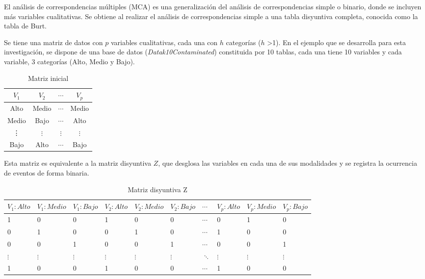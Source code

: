\documentclass[water,article,submit,moreauthors,pdftex]{mdpi}
\begin{document}
El análisis de correspondencias múltiples (MCA) es una generalización
del análisis de correspondencias simple o binario, donde se incluyen más
variables cualitativas. Se obtiene al realizar el análisis de
correspondencias simple a una tabla disyuntiva completa, conocida como
la tabla de Burt.

Se tiene una matriz de datos con \(p\) variables cualitativas, cada una
con \(h\) categorías (\(h\) \textgreater1). En el ejemplo que se
desarrolla para esta investigación, se dispone de una base de datos
(\emph{Datak10Contaminated}) constituida por 10 tablas, cada una tiene
10 variables y cada variable, 3 categorías (Alto, Medio y Bajo).

\begin{table}[!ht]
\begin{center}
 \begin{tabular}{||c c c c||} 
 \hline
 $V_{1}$ & $V_{2}$ & $\cdots$ & $V_{p}$ \\ [0.5ex] 
 \hline\hline
 Alto & Medio & $\cdots$ & Medio\\
 \hline
Medio & Bajo & $\cdots$ & Alto\\
\hline
\vdots & $\vdots$ & $\vdots$ & $\vdots$\\
\hline
Bajo & Alto & $\cdots$ & Bajo \\ [1ex] 
 \hline
\end{tabular}\caption{Matriz inicial}
\label{tab:inicial}
\end{center}
\end{table}

Esta matriz es equivalente a la matriz disyuntiva \(Z\), que desglosa
las variables en cada una de sus modalidades y se registra la ocurrencia
de eventos de forma binaria.

\begin{table}[!ht]
\begin{center}
 \begin{tabular}{||p{1cm}p{1cm}p{1cm}||p{1cm}p{1cm} p{1cm} ||p{1cm} ||p{1cm} p{1cm} p{1cm} ||} 
 \hline
 $V_{1}:Alto$ &$V_{1}:Medio$ &$V_{1}:Bajo$ & $V_{2}:Alto$ & $V_{2}:Medio$ & $V_{2}:Bajo$ & $\cdots$ & $V_{p}:Alto$ & $V_{p}:Medio$ & $V_{p}:Bajo$ \\ [0.5ex] 
 \hline\hline
 1 & 0 & 0 & 1 & 0 & 0 & $\cdots$ & 0 & 1 & 0 \\ [0.2ex] 
 \hline
 0 & 1 & 0 & 0 & 1 & 0 & $\cdots$ & 1 & 0 & 0 \\ 
\hline
 0 & 0 & 1 & 0 & 0 &  1 & $\cdots$ & 0 & 0 & 1 \\ 
\hline
 $\vdots$ & $\vdots$ & $\vdots$ & $\vdots$ & $\vdots$ &  $\vdots$ & $\ddots$ & $\vdots$ & $\vdots$ & $\vdots$ \\ 
\hline
 1 & 0 & 0 & 1 & 0 & 0 & $\cdots$ &1 & 0 & 0 \\  
 \hline
\end{tabular}
\caption{Matriz disyuntiva Z}
\label{tab:z}
\end{center}
\end{table}
\end{document}
